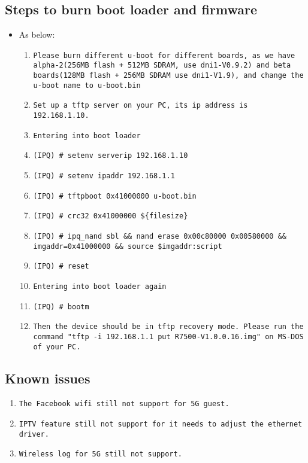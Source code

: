 \documentclass[12pt]{report}
\begin{document}
    \subsection{Steps to burn boot loader and firmware}
    \begin{itemize}
    \item As below:
            \begin{enumerate}
	    	\item \texttt{Please burn different u-boot for different boards, as we have alpha-2(256MB flash + 512MB SDRAM, use dni1-V0.9.2) and beta boards(128MB flash + 256MB SDRAM use dni1-V1.9), and change the u-boot name to u-boot.bin}
		\item \texttt{Set up a tftp server on your PC, its ip address is 192.168.1.10.}
		\item \texttt{Entering into boot loader}
		\item \texttt{(IPQ) \# setenv serverip 192.168.1.10}
		\item \texttt{(IPQ) \# setenv ipaddr 192.168.1.1}
		\item \texttt{(IPQ) \# tftpboot 0x41000000 u-boot.bin}
		\item \texttt{(IPQ) \# crc32 0x41000000 \$\{filesize\}}
		\item \texttt{(IPQ) \# ipq\_nand sbl \&\& nand erase 0x00c80000 0x00580000 \&\& imgaddr=0x41000000 \&\& source \$imgaddr:script}
		\item \texttt{(IPQ) \# reset}
		\item \texttt{Entering into boot loader again}
		\item \texttt{(IPQ) \# bootm}
		\item \texttt{Then the device should be in tftp recovery mode. Please run the command "tftp -i 192.168.1.1 put R7500-V1.0.0.16.img" on MS-DOS of your PC.}
            \end{enumerate}
    \end{itemize}

\subsection{Known issues}
            \begin{enumerate}
		\item \texttt{The Facebook wifi still not support for 5G guest.}
		\item \texttt{IPTV feature still not support for it needs to adjust the ethernet driver.}
		\item \texttt{Wireless log for 5G still not support.}
            \end{enumerate}
\end{document}
